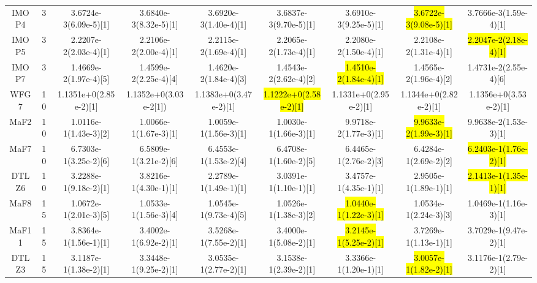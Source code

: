 \documentclass[a4paper,fleqn]{cas-dc}
\newcommand{\highlight}[1]{
	\begingroup
	\sethlcolor{Seashell}%
	\hl{#1}%
	\endgroup
}
\begin{document}
\begin{sloppypar}
\begin{table}[h]
{\begin{tabular}{ccccccccc}
				IMOP4&3 &3.6724e-3(6.09e-5)[1]	&3.6840e-3(8.32e-5)[1]	&3.6920e-3(1.40e-4)[1]	&3.6837e-3(9.70e-5)[1]	&3.6910e-3(9.25e-5)[1]	&\highlight{3.6722e-3(9.08e-5)[1]}	&3.7666e-3(1.59e-4)[1]\\  
				
				IMOP5&3  &2.2207e-2(2.03e-4)[1]	&2.2106e-2(2.00e-4)[1]	&2.2115e-2(1.69e-4)[1]	&2.2065e-2(1.73e-4)[1]	&2.2080e-2(1.50e-4)[1]	&2.2108e-2(1.31e-4)[1]	&\highlight{2.2047e-2(2.18e-4)[1]}\\  
				
				IMOP7&3  &1.4669e-2(1.97e-4)[5]	&1.4599e-2(2.25e-4)[4]	&1.4620e-2(1.84e-4)[3]	&1.4543e-2(2.62e-4)[2]	&\highlight{1.4510e-2(1.84e-4)[1]}	&1.4565e-2(1.96e-4)[2]	&1.4731e-2(2.55e-4)[6]\\  
				
				WFG7&10  &1.1351e+0(2.85e-2)[1]		&1.1352e+0(3.03e-2[1])	&1.1383e+0(3.47e-2)[1]	&\highlight{1.1222e+0(2.58e-2)[1]}	&1.1331e+0(2.95e-2)[1]	&1.1344e+0(2.82e-2)[1]	&1.1356e+0(3.53e-2)[1]\\  
				
				MaF2&10 &1.0116e-1(1.43e-3)[2]		&1.0066e-1(1.67e-3)[1]		&1.0059e-1(1.56e-3)[1]	&1.0030e-1(1.66e-3)[1]	&9.9718e-2(1.77e-3)[1]	&\highlight{9.9633e-2(1.99e-3)[1]}	&9.9638e-2(1.53e-3)[1]\\  
				
				MaF7&10  &6.7303e-1(3.25e-2)[6]	&6.5809e-1(3.21e-2)[6]		&6.4553e-1(1.53e-2)[4]	&6.4708e-1(1.60e-2)[5]	&6.4465e-1(2.76e-2)[3]	&6.4284e-1(2.69e-2)[2]	&\highlight{6.2403e-1(1.76e-2)[1]}\\ 
				
				DTLZ6&10 &3.2288e-1(9.18e-2)[1]	&3.8216e-1(4.30e-1)[1]	&2.2789e-1(1.49e-1)[1]	&3.0391e-1(1.10e-1)[1]	&3.4757e-1(4.35e-1)[1]	&2.9505e-1(1.89e-1)[1]	&\highlight{2.1413e-1(1.35e-1)[1]}\\
				
				MaF8&15 &1.0672e-1(2.01e-3)[5]		&1.0533e-1(1.56e-3)[4]	&1.0545e-1(9.73e-4)[5]	&1.0526e-1(1.38e-3)[2]	&\highlight{1.0440e-1(1.22e-3)[1]}	&1.0534e-1(2.24e-3)[3]	&1.0469e-1(1.16e-3)[1]\\  
				
				MaF11&15 &3.8364e-1(1.56e-1)[1]	&3.4002e-1(6.92e-2)[1]	&3.5268e-1(7.55e-2)[1]	&3.4000e-1(5.08e-2)[1]	&\highlight{3.2145e-1(5.25e-2)[1]}	&3.7269e-1(1.13e-1)[1]	&3.7029e-1(9.47e-2)[1]\\  
				DTLZ3&15 &3.1187e-1(1.38e-2)[1]	&3.3448e-1(9.25e-2)[1]	&3.0535e-1(2.77e-2)[1]	&3.1538e-1(2.39e-2)[1]	&3.3366e-1(1.20e-1)[1]	&\highlight{3.0057e-1(1.82e-2)[1]}	&3.1176e-1(2.79e-2)[1]\\  
				

\end{tabular}}
\end{table}
\end{sloppypar}
\end{document}
